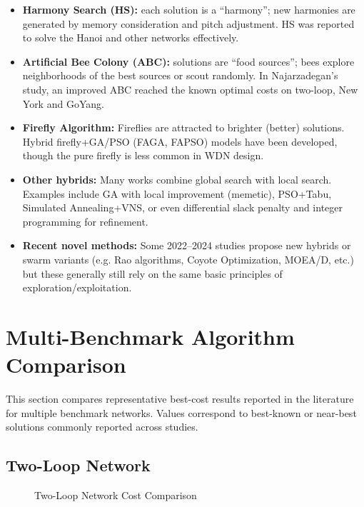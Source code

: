 \documentclass[12pt, a4paper]{article}
\begin{document}
\begin{itemize}
	\item \textbf{Harmony Search (HS):} each solution is a ``harmony''; new harmonies are generated by memory consideration and pitch adjustment. HS was reported to solve the Hanoi and other networks effectively.
	\item \textbf{Artificial Bee Colony (ABC):} solutions are ``food sources''; bees explore neighborhoods of the best sources or scout randomly. In Najarzadegan's study, an improved ABC reached the known optimal costs on two-loop, New York and GoYang\cite{ref9}.
	\item \textbf{Firefly Algorithm:} Fireflies are attracted to brighter (better) solutions. Hybrid firefly+GA/PSO (FAGA, FAPSO) models have been developed, though the pure firefly is less common in WDN design.
	\item \textbf{Other hybrids:} Many works combine global search with local search. Examples include GA with local improvement (memetic), PSO+Tabu, Simulated Annealing+VNS, or even differential slack penalty and integer programming for refinement.
	\item \textbf{Recent novel methods:} Some 2022--2024 studies propose new hybrids or swarm variants (e.g. Rao algorithms, Coyote Optimization, MOEA/D, etc.) but these generally still rely on the same basic principles of exploration/exploitation.
\end{itemize}



\section{Multi-Benchmark Algorithm Comparison}

This section compares representative best-cost results reported in the
literature for multiple benchmark networks. Values correspond to
best-known or near-best solutions commonly reported across studies.


\subsection{Two-Loop Network}

\begin{figure}[H]
	\centering
	\caption{Two-Loop Network Cost Comparison}
\end{figure}
\end{document}
